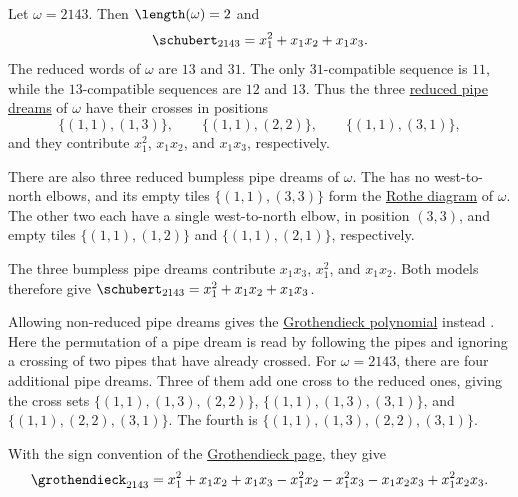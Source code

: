 \begin{example*}
Let $\omega = 2143$.  Then $\length(\omega) = 2$ and
\[
  \schubert_{2143} = x_1^2 + x_1x_2 + x_1x_3.
\]
The reduced words of $\omega$ are $13$ and $31$.  The only $31$-compatible
sequence is $11$, while the $13$-compatible sequences are $12$ and $13$.
Thus the three \hyperref[pipeDream]{reduced pipe dreams} of $\omega$ have their
crosses in positions
\[
  \{(1,1),(1,3)\}, \qquad \{(1,1),(2,2)\}, \qquad \{(1,1),(3,1)\},
\]
and they contribute $x_1^2$, $x_1x_2$, and $x_1x_3$, respectively.


There are also three reduced bumpless pipe dreams of $\omega$.  The
 has no west-to-north elbows, and its empty
tiles $\{(1,1),(3,3)\}$ form the
\hyperref[rotheDiagram]{Rothe diagram} of $\omega$.  The other two
each have a single west-to-north elbow, in position $(3,3)$, and empty tiles
$\{(1,1),(1,2)\}$ and $\{(1,1),(2,1)\}$, respectively.


The three bumpless pipe dreams contribute $x_1x_3$, $x_1^2$, and $x_1x_2$.  Both
models therefore give $\schubert_{2143} = x_1^2 + x_1x_2 + x_1x_3$.

Allowing non-reduced pipe dreams gives the
\hyperref[grothendieckPipedreams]{Grothendieck polynomial} instead
\cite[Thm.~4.3]{Weigandt2025x}.  Here the permutation of a pipe dream is read
by following the pipes and ignoring a crossing of two pipes that have already
crossed.  For $\omega = 2143$, there are four
additional pipe dreams.  Three of them add one cross to the reduced ones,
giving the cross sets $\{(1,1),(1,3),(2,2)\}$,
$\{(1,1),(1,3),(3,1)\}$, and $\{(1,1),(2,2),(3,1)\}$.  The fourth is
$\{(1,1),(1,3),(2,2),(3,1)\}$.


With the sign convention of
the \hyperref[grothendieckOperatorformula]{Grothendieck page}, they give
\[
  \grothendieck_{2143}
  = x_1^2 + x_1x_2 + x_1x_3 - x_1^2x_2 - x_1^2x_3 - x_1x_2x_3 + x_1^2x_2x_3 .
\]
\end{example*}

